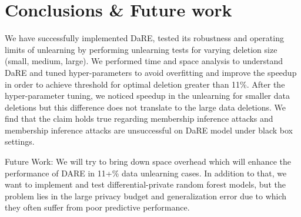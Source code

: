 \documentclass[11pt,letterpaper]{article}
\begin{document}
\section{Conclusions \& Future work}

We have successfully implemented DaRE, tested its robustness and operating limits of unlearning by performing unlearning tests for varying deletion size (small, medium, large). We performed time and space analysis to understand DaRE and tuned hyper-parameters to avoid overfitting and improve the speedup in order to achieve threshold for optimal deletion greater than 11\%. After the hyper-parameter tuning, we noticed speedup in the unlearning for smaller data deletions but this difference does not translate to the large data deletions. We find that the claim holds true regarding membership inference attacks and membership inference attacks are unsuccessful on DaRE model under black box settings.

Future Work: We will try to bring down space overhead which will enhance the performance of DARE in 11+\% data unlearning cases. In addition to that, we want to implement and test differential-private random forest models, but the problem lies in the large privacy budget and generalization error due to which they often suffer from poor predictive performance.


\end{document}
